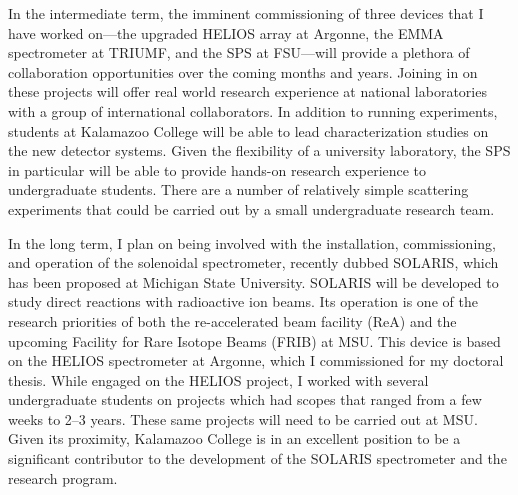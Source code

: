 {In the intermediate term, the imminent commissioning of three devices that I have worked on---the upgraded HELIOS array at Argonne, the EMMA spectrometer at TRIUMF, and the SPS at FSU---will provide a plethora of collaboration opportunities over the coming months and years.
Joining in on these projects will offer real world research experience at national laboratories with a group of international collaborators.
In addition to running experiments, students at Kalamazoo College will be able to lead characterization studies on the new detector systems.
Given the flexibility of a university laboratory, the SPS in particular will be able to provide hands-on research experience to undergraduate students. There are a number of relatively simple scattering experiments that could be carried out by a small undergraduate research team.

In the long term, I plan on being involved with the installation, commissioning, and operation of the solenoidal spectrometer, recently dubbed 
SOLARIS, which has been proposed at Michigan State University. SOLARIS will be developed to study direct reactions with radioactive ion beams. Its operation is one of the research priorities 
of both the re-accelerated beam facility (ReA) and the upcoming Facility for Rare Isotope Beams (FRIB) at MSU. 
This device is based on the HELIOS spectrometer at Argonne, which I commissioned for my doctoral thesis. While engaged on the HELIOS project, I worked with several undergraduate students on projects which had scopes that ranged from a few weeks to 2--3 years. These same projects will need to be carried out at MSU. 
Given its proximity, Kalamazoo College is in an excellent position to be a significant contributor to the development of the SOLARIS spectrometer and the research program. 
}
